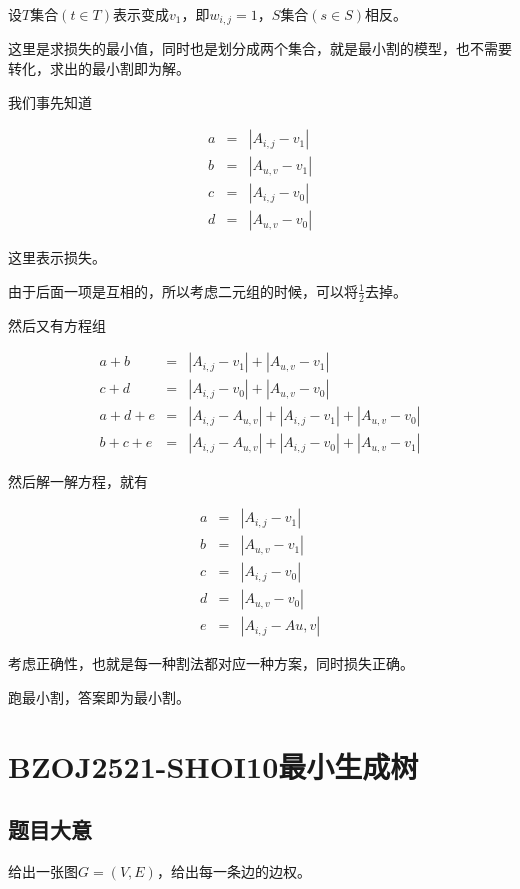 \documentclass{ctexart}
\numberwithin{equation}{section}
\begin{document}
\begin{flushleft}
  设$T$集合$(t\in T)$表示变成$v_1$，即$w_{i,j}=1$，$S$集合$(s\in S)$相反。

  这里是求损失的最小值，同时也是划分成两个集合，就是最小割的模型，也不需要转化，求出的最小割即为解。

  我们事先知道
  
   \begin{eqnarray*} 
    a  &=&  |A_{i,j}-v_1|\\
    b  &=&  |A_{u,v}-v_1|\\
    c  &=&  |A_{i,j}-v_0|\\
    d  &=&  |A_{u,v}-v_0|
   \end{eqnarray*}

   这里表示损失。

   由于后面一项是互相的，所以考虑二元组的时候，可以将$\frac{1}{2}$去掉。
   
   然后又有方程组

   \begin{eqnarray*} 
    a + b  &=&  |A_{i,j}-v_1|+|A_{u,v}-v_1|\\
    c + d  &=&  |A_{i,j}-v_0|+|A_{u,v}-v_0|\\
    a + d + e  &=& |A_{i,j}-A_{u,v}| + |A_{i,j}-v_1| + |A_{u,v}-v_0|\\
    b + c + e  &=& |A_{i,j}-A_{u,v}| + |A_{i,j}-v_0| + |A_{u,v}-v_1|
   \end{eqnarray*}

   \newpage
   
   然后解一解方程，就有

   \begin{eqnarray*} 
    a  &=&  |A_{i,j}-v_1|\\
    b  &=&  |A_{u,v}-v_1|\\
    c  &=&  |A_{i,j}-v_0|\\
    d  &=&  |A_{u,v}-v_0|\\
    e  &=&  |A_{i,j}-A{u,v}|
   \end{eqnarray*}

   考虑正确性，也就是每一种割法都对应一种方案，同时损失正确。

   跑最小割，答案即为最小割。

   \newpage

   \section{BZOJ2521-SHOI10最小生成树}
  \subsection{题目大意}
  给出一张图$G=(V,E)$，给出每一条边的边权。


\end{flushleft}
\end{document}
